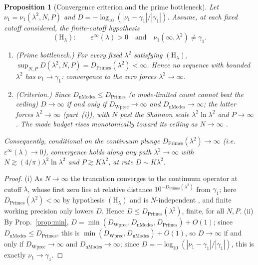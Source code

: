 \documentclass[11pt,a4paper]{article}
\newtheorem{proposition}{Proposition}
\begin{document}
\begin{proposition}[Convergence criterion and the prime bottleneck]\label{prop:limit}
Let $\nu_1=\nu_1(\lambda^2,N,P)$ and $D=-\log_{10}(|\nu_1-\gamma_1|/|\gamma_1|)$.
Assume, at each fixed cutoff considered, the finite-cutoff hypothesis
\begin{equation}\label{eq:poshyp}
  (\mathrm{H}_\lambda):\qquad \varepsilon^\infty(\lambda)>0
  \quad\text{and}\quad \nu_1(\infty,\lambda^2)\neq\gamma_1 .
\end{equation}
\begin{enumerate}
\item[(i)] \emph{(Prime bottleneck.)} For every fixed $\lambda^2$ satisfying
  $(\mathrm{H}_\lambda)$,
  $\sup_{N,P}D(\lambda^2,N,P)=D_{\mathrm{Primes}}(\lambda^2)<\infty$. Hence no
  sequence with bounded $\lambda^2$ has $\nu_1\to\gamma_1$: convergence to the
  zero forces $\lambda^2\to\infty$.
\item[(ii)] \emph{(Criterion.)} Since $D_{\mathrm{nModes}}\le D_{\mathrm{Primes}}$
  (a mode-limited count cannot beat the ceiling) $D\to\infty$ if and only if
  $D_{\mathrm{Wprec}}\to\infty$ and $D_{\mathrm{nModes}}\to\infty$; the latter
  forces $\lambda^2\to\infty$ (part~(i)), with $N$ past the Shannon scale
  $\lambda^2\ln\lambda^2$ and $P\to\infty$. The mode budget rises monotonically
  toward its ceiling as $N\to\infty$ \cite[Prop.~3.4]{CCM2025}.
\end{enumerate}
Consequently, conditional on the continuum plunge
$D_{\mathrm{Primes}}(\lambda^2)\to\infty$ (i.e.\ $\varepsilon^\infty(\lambda)\to0$),
convergence holds along any path $\lambda^2\to\infty$ with
$N\gtrsim(4/\pi)\lambda^2\ln\lambda^2$ and $P\gtrsim K\lambda^2$, at rate
$D\sim K\lambda^2$.
\end{proposition}
\begin{proof}
(i) As $N\to\infty$ the truncation converges to the continuum operator at cutoff
$\lambda$, whose first zero lies at relative distance
$10^{-D_{\mathrm{Primes}}(\lambda^2)}$ from $\gamma_1$; here
$D_{\mathrm{Primes}}(\lambda^2)<\infty$ by hypothesis
$(\mathrm{H}_\lambda)$ and is $N$-independent
\cite[Thm.~1.3]{Suzuki2026}, and finite working precision only lowers $D$.
Hence $D\le D_{\mathrm{Primes}}(\lambda^2)$, finite, for all $N,P$.
(ii) By Prop.~\ref{prop:min}, $D=\min(D_{\mathrm{Wprec}},D_{\mathrm{nModes}},
D_{\mathrm{Primes}})+O(1)$; since $D_{\mathrm{nModes}}\le D_{\mathrm{Primes}}$,
this is $\min(D_{\mathrm{Wprec}},D_{\mathrm{nModes}})+O(1)$, so $D\to\infty$ if and
only if $D_{\mathrm{Wprec}}\to\infty$ and $D_{\mathrm{nModes}}\to\infty$; since
$D=-\log_{10}(|\nu_1-\gamma_1|/|\gamma_1|)$, this is exactly
$\nu_1\to\gamma_1$.
\end{proof}
\end{document}
